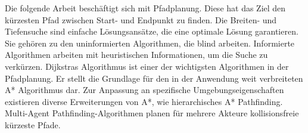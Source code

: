 \kurzfassung

Die folgende Arbeit beschäftigt sich mit Pfadplanung. Diese hat das Ziel den kürzesten Pfad zwischen Start- und Endpunkt zu finden. Die Breiten- und Tiefensuche sind einfache Lösungsansätze, die eine optimale Lösung garantieren. Sie gehören zu den uninformierten Algorithmen, die blind arbeiten. Informierte Algorithmen arbeiten mit heuristischen Informationen, um die Suche zu verkürzen. Dijkstras Algorithmus ist einer der wichtigsten Algorithmen in der Pfadplanung. Er stellt die Grundlage für den in der Anwendung weit verbreiteten A* Algorithmus dar. Zur Anpassung an spezifische Umgebungseigenschaften existieren diverse Erweiterungen von A*, wie hierarchisches A* Pathfinding. Multi-Agent Pathfinding-Algorithmen planen für mehrere Akteure kollisionsfreie kürzeste Pfade.

